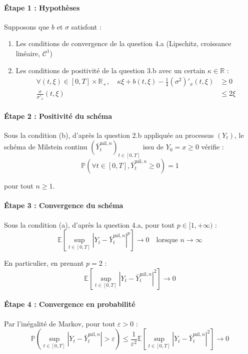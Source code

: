 \documentclass[12pt,a4paper]{article}
\theoremstyle{definition}
\theoremstyle{remark}
\newcommand{\R}{\mathbb{R}}
\newcommand{\E}{\mathbb{E}}
\newcommand{\Prob}{\mathbb{P}}
\newcommand{\supt}[1]{\sup_{t \in #1}}
\begin{document}
\paragraph{Étape 1 : Hypothèses}

Supposons que $b$ et $\sigma$ satisfont :
\begin{enumerate}[label=(\alph*)]
\item Les conditions de convergence de la question 4.a (Lipschitz, croissance linéaire, $\mathcal{C}^1$)
\item Les conditions de positivité de la question 3.b avec un certain $\kappa \in \R$ :
\begin{align*}
\forall (t,\xi) \in [0,T] \times \R_+, \quad \kappa \xi + b(t,\xi) - \frac{1}{4}(\sigma^2)'_x(t,\xi) &\geq 0 \\
\frac{\sigma}{\sigma'_x}(t,\xi) &\leq 2\xi
\end{align*}
\end{enumerate}

\paragraph{Étape 2 : Positivité du schéma}

Sous la condition (b), d'après la question 2.b appliquée au processus $(Y_t)$, le schéma de Milstein continu $(\bar{Y}_t^{\text{mil},n})_{t \in [0,T]}$ issu de $Y_0 = x \geq 0$ vérifie :
\[
\Prob\left(\forall t \in [0,T], \bar{Y}_t^{\text{mil},n} \geq 0\right) = 1
\]

pour tout $n \geq 1$.

\paragraph{Étape 3 : Convergence du schéma}

Sous la condition (a), d'après la question 4.a, pour tout $p \in [1,+\infty)$ :
\[
\E\left[\supt{[0,T]} |Y_t - \bar{Y}_t^{\text{mil},n}|^p\right] \to 0 \quad \text{lorsque } n \to \infty
\]

En particulier, en prenant $p = 2$ :
\[
\E\left[\supt{[0,T]} |Y_t - \bar{Y}_t^{\text{mil},n}|^2\right] \to 0
\]

\paragraph{Étape 4 : Convergence en probabilité}

Par l'inégalité de Markov, pour tout $\varepsilon > 0$ :
\[
\Prob\left(\supt{[0,T]} |Y_t - \bar{Y}_t^{\text{mil},n}| > \varepsilon\right) \leq \frac{1}{\varepsilon^2}\E\left[\supt{[0,T]} |Y_t - \bar{Y}_t^{\text{mil},n}|^2\right] \to 0
\]
\end{document}
